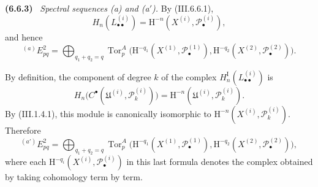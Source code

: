 \documentclass[10pt,oneside]{book}
\newcommand{\sh}[1]{\mathscr{#1}}
\newcommand{\HH}{\mathrm H}
\newcommand{\Tor}{\operatorname{Tor}}
\newcommand{\sref}[2][]{(#2)}
\newenvironment{env}[1][]{\par\medskip\noindent\textbf{(#1)}\ }{\par}
\begin{document}
\begin{env}[6.6.3]
\label{III.6.6.3}
\emph{Spectral sequences \textnormal{(a)} and
\textnormal{(a$'$)}.}
By \sref{III.6.6.1},
\[
  H_n(L_{\bullet\bullet}^{(i)})
  =
  \HH^{-n}(X^{(i)},\sh P_\bullet^{(i)}),
\]
and hence
\[
  {}^{(a)}E_{pq}^2
  =
  \bigoplus_{q_1+q_2=q}
  \Tor_p^A
  \bigl(
    \HH^{-q_1}(X^{(1)},\sh P_\bullet^{(1)}),
    \HH^{-q_2}(X^{(2)},\sh P_\bullet^{(2)})
  \bigr).
\]

By definition, the component of degree $k$ of the complex
$H_n^{\mathrm I}(L_{\bullet\bullet}^{(i)})$ is
\[
  H_n\bigl(
    C^\bullet(\mathfrak U^{(i)},\sh P_k^{(i)})
  \bigr)
  =
  \HH^{-n}(\mathfrak U^{(i)},\sh P_k^{(i)}).
\]
By \sref{III.1.4.1}, this module is canonically isomorphic to
$\HH^{-n}(X^{(i)},\sh P_k^{(i)})$.  Therefore
\[
  {}^{(a')}E_{pq}^2
  =
  \bigoplus_{q_1+q_2=q}
  \Tor_p^A
  \bigl(
    \HH^{-q_1}(X^{(1)},\sh P_\bullet^{(1)}),
    \HH^{-q_2}(X^{(2)},\sh P_\bullet^{(2)})
  \bigr),
\]
where each $\HH^{-q_i}(X^{(i)},\sh P_\bullet^{(i)})$ in this
last formula denotes the complex obtained by taking cohomology
term by term.
\end{env}
\end{document}
